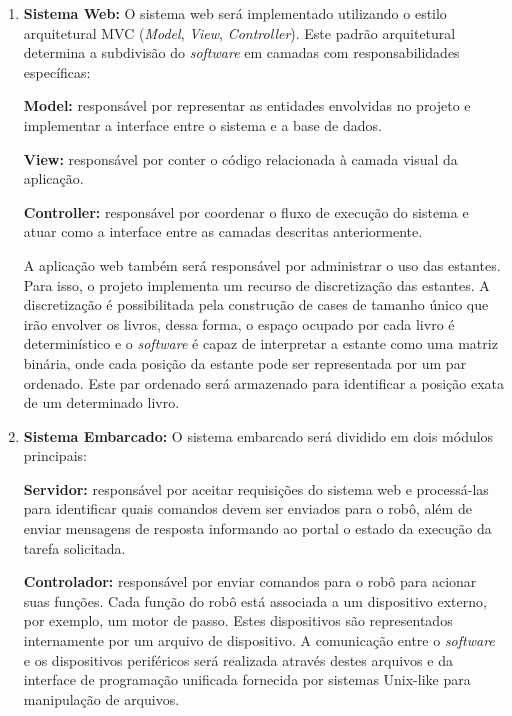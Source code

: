 \begin{enumerate}
    \item\textbf{Sistema Web:} O sistema web será implementado utilizando o estilo arquitetural MVC (\textit{Model}, \textit{View}, \textit{Controller}). Este padrão arquitetural determina a subdivisão do \textit{software} em camadas com responsabilidades específicas:

    \subitem\textbf{Model:} responsável por representar as entidades envolvidas no projeto e implementar a interface entre o sistema e a base de dados.

    \subitem\textbf{View:} responsável por conter o código relacionada à camada visual da aplicação.

    \subitem\textbf{Controller:} responsável por coordenar o fluxo de execução do sistema e atuar como a interface entre as camadas descritas anteriormente.
    
    A aplicação web também será responsável por administrar o uso das estantes. Para isso, o projeto implementa um recurso de discretização das estantes. A discretização é possibilitada pela construção de cases de tamanho único que irão envolver os livros, dessa forma, o espaço ocupado por cada livro é determinístico e o \textit{software} é capaz de interpretar a estante como uma matriz binária, onde cada posição da estante pode ser representada por um par ordenado. Este par ordenado será armazenado para identificar a posição exata de um determinado livro.


    \item\textbf{Sistema Embarcado:} O sistema embarcado será dividido em dois módulos principais:

    \subitem\textbf{Servidor:} responsável por aceitar requisições do sistema web e processá-las para identificar quais comandos devem ser enviados para o robô, além de enviar mensagens de resposta informando ao portal o estado da execução da tarefa solicitada.

    \subitem\textbf{Controlador: } responsável por enviar comandos para o robô para acionar suas funções. Cada função do robô está associada a um dispositivo externo, por exemplo, um motor de passo. Estes dispositivos são representados internamente por um arquivo de dispositivo. A comunicação entre o \textit{software} e os dispositivos periféricos será realizada através destes arquivos e da interface de programação unificada fornecida por sistemas Unix-like para manipulação de arquivos.
    
\end{enumerate}



